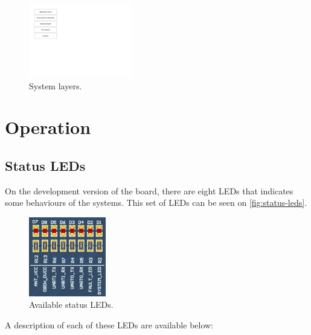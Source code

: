 \begin{figure}[!ht]
    \begin{center}
        \includegraphics[width=0.4\textwidth]{figures/system_layers.pdf}
        \caption{System layers.}
        \label{fig:system-layers}
    \end{center}
\end{figure}

\section{Operation}

\subsection{Status LEDs} \label{sec:status-leds}

On the development version of the board, there are eight LEDs that indicates some behaviours of the systems. This set of LEDs can be seen on \autoref{fig:status-leds}.

\begin{figure}[!ht]
    \begin{center}
        \includegraphics[width=0.3\textwidth]{figures/status_leds.png}
        \caption{Available status LEDs.}
        \label{fig:status-leds}
    \end{center}
\end{figure}

A description of each of these LEDs are available below:

